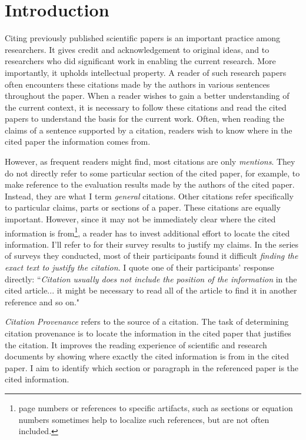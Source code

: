 \chapter{Introduction}
\label{introduction}
Citing previously published scientific papers is an important practice among researchers. It gives credit and acknowledgement to original ideas, and to researchers who did significant work in enabling the current research.  More importantly, it upholds intellectual property. A reader of such research papers often encounters these citations made by the authors in various sentences throughout the paper. When a reader wishes to gain a better understanding of the current context, it is necessary to follow these citations and read the cited papers to understand the basis for the current work.  Often, when reading the claims of a sentence supported by a citation, readers wish to know where in the cited paper the information comes from.  

However, as frequent readers might find, most citations are only \textit{mentions}. They do not directly refer to some particular section of the cited paper, for example, to make reference to the evaluation results made by the authors of the cited paper. Instead, they are what I term {\it general} citations. Other citations refer specifically to particular claims, parts or sections of a paper.  These citations are equally important.  However, since it may not be immediately clear where the cited information is from\footnote{page numbers or references to specific artifacts, such as sections or equation numbers sometimes help to localize such references, but are not often included.}, a reader has to invest additional effort to locate the cited information. I'll refer to \cite{citation-sensitive} for their survey results to justify my claims. In the series of surveys they conducted, most of their participants found it difficult \textit{finding the exact text to justify the citation}. I quote one of their participants' response directly: ``\textit{Citation usually does not include the position of the information} in the cited article... it might be necessary to read all of the article to find it in another reference and so on." \cite{citation-sensitive}

{\it Citation Provenance} refers to the source of a citation. The task of determining citation provenance is to locate the information in the cited paper that justifies the citation. It improves the reading experience of scientific and research documents by showing where exactly the cited information is from in the cited paper. I aim to identify which section or paragraph in the referenced paper is the cited information. 

